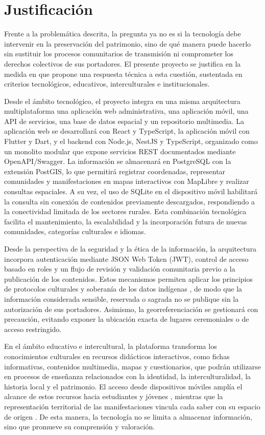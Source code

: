 \section{Justificación}
Frente a la problemática descrita, la pregunta ya no es si la tecnología debe intervenir en la preservación del patrimonio, sino de qué manera puede hacerlo sin sustituir los procesos comunitarios de transmisión ni comprometer los derechos colectivos de sus portadores. El presente proyecto se justifica en la medida en que propone una respuesta técnica a esta cuestión, sustentada en criterios tecnológicos, educativos, interculturales e institucionales.

Desde el ámbito tecnológico, el proyecto integra en una misma arquitectura multiplataforma una aplicación web administrativa, una aplicación móvil, una API de servicios, una base de datos espacial y un repositorio multimedia. La aplicación web se desarrollará con React y TypeScript, la aplicación móvil con Flutter y Dart, y el backend con Node.js, NestJS y TypeScript, organizado como un monolito modular que expone servicios REST documentados mediante OpenAPI/Swagger. La información se almacenará en PostgreSQL con la extensión PostGIS, lo que permitirá registrar coordenadas, representar comunidades y manifestaciones en mapas interactivos con MapLibre y realizar consultas espaciales. A su vez, el uso de SQLite en el dispositivo móvil habilitará la consulta sin conexión de contenidos previamente descargados, respondiendo a la conectividad limitada de los sectores rurales. Esta combinación tecnológica facilita el mantenimiento, la escalabilidad y la incorporación futura de nuevas comunidades, categorías culturales e idiomas.

Desde la perspectiva de la seguridad y la ética de la información, la arquitectura incorpora autenticación mediante JSON Web Token (JWT), control de acceso basado en roles y un flujo de revisión y validación comunitaria previo a la publicación de los contenidos. Estos mecanismos permiten aplicar los principios de protocolos culturales y soberanía de los datos indígenas \cite{christen2012information,hudson2023indigenous}, de modo que la información considerada sensible, reservada o sagrada no se publique sin la autorización de sus portadores. Asimismo, la georreferenciación se gestionará con precaución, evitando exponer la ubicación exacta de lugares ceremoniales o de acceso restringido.

En el ámbito educativo e intercultural, la plataforma transforma los conocimientos culturales en recursos didácticos interactivos, como fichas informativas, contenidos multimedia, mapas y cuestionarios, que podrán utilizarse en procesos de enseñanza relacionados con la identidad, la interculturalidad, la historia local y el patrimonio. El acceso desde dispositivos móviles amplía el alcance de estos recursos hacia estudiantes y jóvenes \cite{sarrab2012mobile}, mientras que la representación territorial de las manifestaciones vincula cada saber con su espacio de origen \cite{gretzel2015smart}. De esta manera, la tecnología no se limita a almacenar información, sino que promueve su comprensión y valoración.

